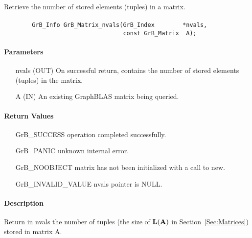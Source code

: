 Retrieve the number of stored elements (tuples) in a matrix.

\paragraph{\syntax}

\begin{verbatim}
        GrB_Info GrB_Matrix_nvals(GrB_Index        *nvals,
                                  const GrB_Matrix  A);
\end{verbatim}

\paragraph{Parameters}

\begin{itemize}[leftmargin=1.1in]
    \item[{\sf nvals}] ({\sf OUT}) On successful return, contains the number of 
    stored elements (tuples) in the matrix.
    \item[{\sf A}] ({\sf IN}) An existing GraphBLAS matrix being queried.
\end{itemize}

\paragraph{Return Values}

\begin{itemize}[leftmargin=2.1in]
\item[{\sf GrB\_SUCCESS}]   operation completed successfully.
\item[{\sf GrB\_PANIC}]     unknown internal error.
\item[{\sf GrB\_NOOBJECT}]  matrix has not been initialized with a call to {\sf new}.
\item[{\sf GrB\_INVALID\_VALUE}]    {\sf nvals} pointer is {\sf NULL}.
\end{itemize}

\paragraph{Description}

Return in {\sf nvals} the number of tuples (the size of $\bold{L}({\bf A})$
in Section~\ref{Sec:Matrices}) stored in matrix {\sf A}.
